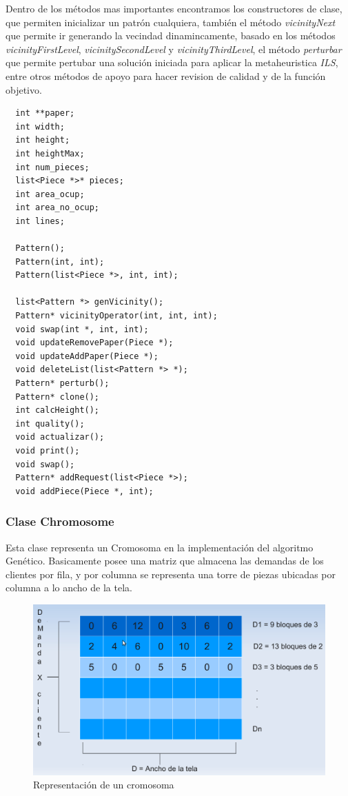 \documentclass[letterpaper,11pt]{article}
\begin{document}
Dentro de los m\'etodos mas importantes encontramos los constructores de clase, que permiten inicializar un patr\'on cualquiera, tambi\'en el m\'etodo \emph{vicinityNext} que permite ir generando la vecindad dinamincamente, basado en
los m\'etodos \emph{vicinityFirstLevel}, \emph{vicinitySecondLevel} y \emph{vicinityThirdLevel}, el m\'etodo \emph{perturbar} que permite pertubar una soluci\'on iniciada para aplicar la metaheuristica \emph{ILS}, entre otros m\'etodos de apoyo para hacer revision de calidad y de la funci\'on objetivo.

\begin{verbatim}
  int **paper;
  int width;
  int height;
  int heightMax;
  int num_pieces;
  list<Piece *>* pieces;
  int area_ocup;
  int area_no_ocup;
  int lines;
  
  Pattern();
  Pattern(int, int);
  Pattern(list<Piece *>, int, int);

  list<Pattern *> genVicinity();
  Pattern* vicinityOperator(int, int, int);
  void swap(int *, int, int);
  void updateRemovePaper(Piece *);
  void updateAddPaper(Piece *);
  void deleteList(list<Pattern *> *);
  Pattern* perturb();
  Pattern* clone();
  int calcHeight();
  int quality();
  void actualizar();
  void print();
  void swap();
  Pattern* addRequest(list<Piece *>);
  void addPiece(Piece *, int);
\end{verbatim}

\subsubsection{Clase Chromosome}

Esta clase representa un Cromosoma en la implementaci\'on del algoritmo Gen\'etico. Basicamente posee una matriz
que almacena las demandas de los clientes por fila, y por columna se representa una torre de piezas ubicadas por columna a lo ancho de la tela. 

\begin{figure}[htp]
\centering
\includegraphics[scale=0.2]{ch.png}
\caption{Representaci\'on de un cromosoma}
\end{figure}
\end{document}
